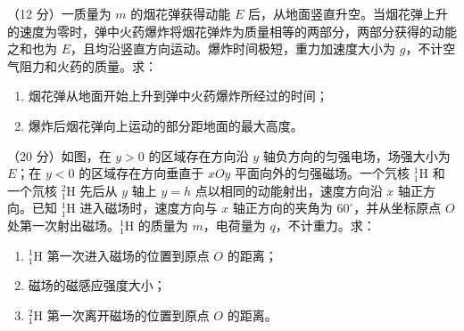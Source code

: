 \begin{question}
（12 分）一质量为 $m$ 的烟花弹获得动能 $E$ 后，从地面竖直升空。当烟花弹上升的速度为零时，弹中火药爆炸将烟花弹炸为质量相等的两部分，两部分获得的动能之和也为 $E$，且均沿竖直方向运动。爆炸时间极短，重力加速度大小为 $g$，不计空气阻力和火药的质量。求：
\begin{enumerate}[leftmargin=2em, label=(\arabic*)]
  \item 烟花弹从地面开始上升到弹中火药爆炸所经过的时间；
  \item 爆炸后烟花弹向上运动的部分距地面的最大高度。
\end{enumerate}
\end{question}

\begin{question}
（20 分）如图，在 $y>0$ 的区域存在方向沿 $y$ 轴负方向的匀强电场，场强大小为 $E$；在 $y<0$ 的区域存在方向垂直于 $xOy$ 平面向外的匀强磁场。一个氕核 ${}_{1}^{1}\mathrm{H}$ 和一个氘核 ${}_{1}^{2}\mathrm{H}$ 先后从 $y$ 轴上 $y=h$ 点以相同的动能射出，速度方向沿 $x$ 轴正方向。已知 ${}_{1}^{1}\mathrm{H}$ 进入磁场时，速度方向与 $x$ 轴正方向的夹角为 $60^{\circ}$，并从坐标原点 $O$ 处第一次射出磁场。${}_{1}^{1}\mathrm{H}$ 的质量为 $m$，电荷量为 $q$，不计重力。求：
\begin{enumerate}[leftmargin=2em, label=(\arabic*)]
  \item ${}_{1}^{1}\mathrm{H}$ 第一次进入磁场的位置到原点 $O$ 的距离；
  \item 磁场的磁感应强度大小；
  \item ${}_{1}^{2}\mathrm{H}$ 第一次离开磁场的位置到原点 $O$ 的距离。
\end{enumerate}

\end{question}


